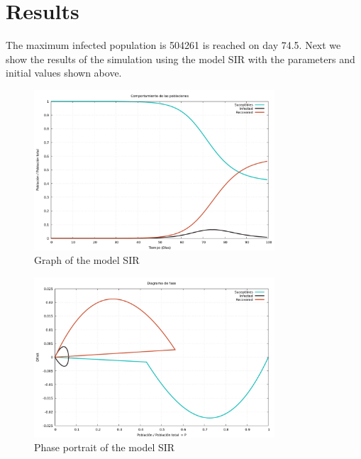 \documentclass{article}
\begin{document}
\section*{Results}
The maximum infected population is 504261 is reached on day 74.5.
Next we show the results of the simulation using the model SIR with the parameters and initial values shown above.
\begin{figure}[H]
\centering
\includegraphics[width=0.8\textwidth]{./data/Proyecto1/graph-SIR.png}
\caption{Graph of the model SIR}
\end{figure}
\begin{figure}[H]
\centering
\includegraphics[width=0.8\textwidth]{./data/Proyecto1/phase-SIR.png}
\caption{Phase portrait of the model SIR}
\end{figure}
\end{document}
